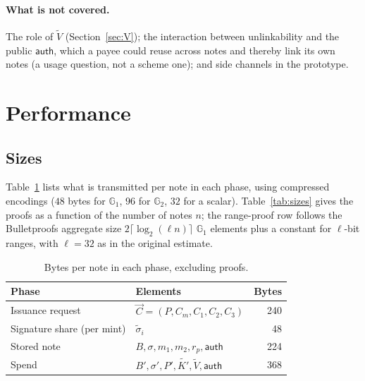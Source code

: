 \documentclass[10pt,a5paper]{article}
\newcommand{\tabsize}{\small}\newcommand{\legendsize}{\footnotesize}
\newcommand{\tabsize}{}\newcommand{\legendsize}{\small}
\newcommand{\K}[1]{#1}                      %
\newcommand{\Go}[1]{#1}                     %
\newcommand{\Gt}[1]{\tilde{#1}}             %
\newcommand{\K}[1]{{\color{ScalarCol}#1}}   %
\newcommand{\Go}[1]{{\color{GoneCol}#1}}    %
\newcommand{\Gt}[1]{{\color{GtwoCol}#1}}    %
\newcommand{\GG}[1]{\mathbb{G}_{#1}}
\newcommand{\auth}{\mathsf{auth}}
\newcommand{\vv}[1]{\vec{#1}}
\begin{document}
\paragraph{What is not covered.} The role of $\Gt{V}$ (Section~\ref{sec:V});
the interaction between unlinkability and the public $\auth$, which a payee
could reuse across notes and thereby link its own notes (a usage question, not
a scheme one); and side channels in the prototype.

\section{Performance}
\label{sec:perf}

\subsection{Sizes}

Table~\ref{tab:elems} lists what is transmitted per note in each phase, using
compressed encodings ($48$ bytes for $\GG{1}$, $96$ for $\GG{2}$, $32$ for a
scalar). Table~\ref{tab:sizes} gives the proofs as a function of the number of
notes $n$; the range-proof row follows the Bulletproofs aggregate size
$2\lceil\log_2(\ell n)\rceil$ $\GG{1}$ elements plus a constant for $\ell$-bit
ranges, with $\ell = 32$ as in the original estimate.

\begin{table}[htbp]
\centering
\caption{Bytes per note in each phase, excluding proofs.}
\label{tab:elems}
\tabsize
\begin{tabular}{@{}llr@{}}
\toprule
Phase & Elements & Bytes \\
\midrule
Issuance request & $\vv{C} = (\Go{P},\Go{C_m},\Go{C_1},\Go{C_2},\Go{C_3})$ & 240 \\
Signature share (per mint) & $\Go{\widetilde{\sigma}_i}$ & 48 \\
Stored note & $\Go{B},\Go{\sigma},\K{m_1},\K{m_2},\K{r_p},\auth$ & 224 \\
Spend & $\Go{B'},\Go{\sigma'},\Go{P'},\Gt{K'},\Gt{V},\auth$ & 368 \\
\bottomrule
\end{tabular}
\end{table}
\end{document}
